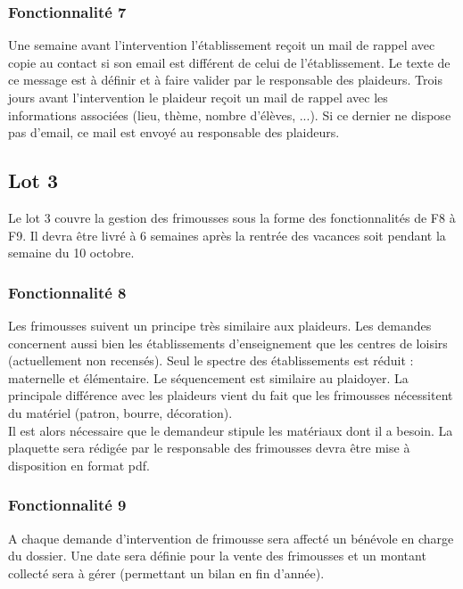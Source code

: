 \subsubsection{Fonctionnalité 7}
Une semaine avant l'intervention l'établissement reçoit un mail de rappel avec
copie au contact si son email est différent de celui de l'établissement. Le texte de ce message est à définir et à faire valider par le responsable des plaideurs. Trois jours avant l'intervention le plaideur reçoit un mail de rappel avec les informations associées (lieu, thème, nombre d'élèves, ...). Si ce dernier ne dispose pas d'email, ce mail est envoyé au responsable des plaideurs. 
\\

\subsection{Lot 3}

Le lot 3 couvre la gestion des frimousses sous la forme des fonctionnalités de F8 à F9. Il devra être livré à 6 semaines après la rentrée des vacances soit pendant la semaine du 10 octobre.
\\

\subsubsection{Fonctionnalité 8}
Les frimousses suivent un principe très similaire aux plaideurs. Les demandes concernent aussi bien les établissements d'enseignement que les centres de loisirs (actuellement non recensés). Seul le spectre des établissements est réduit : maternelle et élémentaire. Le séquencement est similaire au plaidoyer.
La principale différence avec les plaideurs vient du fait que les frimousses nécessitent du matériel (patron, bourre, décoration). \\
 Il est alors nécessaire que le demandeur stipule les matériaux dont il a
besoin.
La plaquette sera rédigée par le responsable des frimousses devra être mise à disposition en format pdf. 
\\

\subsubsection{Fonctionnalité 9}
A chaque demande d'intervention de frimousse sera affecté un bénévole en charge du dossier. Une date sera définie pour la vente des frimousses et un montant collecté sera à gérer (permettant un bilan en fin d'année).
\\


